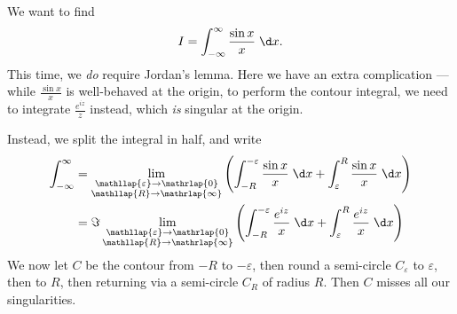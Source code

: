 \documentclass[a4paper]{article}
\begin{document}
\begin{eg}
  We want to find
  \[
    I = \int_{-\infty}^\infty \frac{\sin x}{x}\;\d x.
  \]
  This time, we \emph{do} require Jordan's lemma. Here we have an extra complication --- while $\frac{\sin x}{x}$ is well-behaved at the origin, to perform the contour integral, we need to integrate $\frac{e^{iz}}{z}$ instead, which \emph{is} singular at the origin.

  Instead, we split the integral in half, and write
  \begin{align*}
    \int_{-\infty}^\infty &= \lim_{\substack{\mathllap{\varepsilon} \to \mathrlap{0}\\\mathllap{R}\to\mathrlap{\infty}}} \left(\int_{-R}^{-\varepsilon} \frac{\sin x}{x}\;\d x + \int_\varepsilon^R \frac{\sin x}{x}\;\d x\right)\\
    &= \Im \lim_{\substack{\mathllap{\varepsilon} \to \mathrlap{0}\\\mathllap{R}\to\mathrlap{\infty}}} \left(\int_{-R}^{-\varepsilon} \frac{e^{iz}}{x}\;\d x + \int_\varepsilon^R \frac{e^{iz}}{x}\;\d x\right)
  \end{align*}
  We now let $C$ be the contour from $-R$ to $-\varepsilon$, then round a semi-circle $C_\varepsilon$ to $\varepsilon$, then to $R$, then returning via a semi-circle $C_R$ of radius $R$. Then $C$ misses all our singularities.
  \begin{center}
\end{center}
\end{eg}
\end{document}
